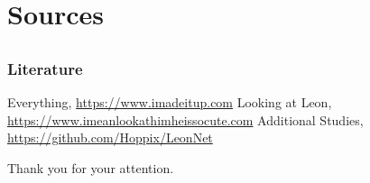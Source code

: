 \documentclass[compress]{beamer}
\begin{document}
\section{Sources}
\subsection*{}

\begin{frame}
\frametitle{Literature}
\begin{small}
\begin{thebibliography}{50}
 Everything, \url{https://www.imadeitup.com}
 Looking at Leon, \url{https://www.imeanlookathimheissocute.com}
 Additional Studies, \url{https://github.com/Hoppix/LeonNet}
\end{thebibliography}
\end{small}
\end{frame}

\begin{frame}
Thank you for your attention.
\end{frame}
\end{document}
